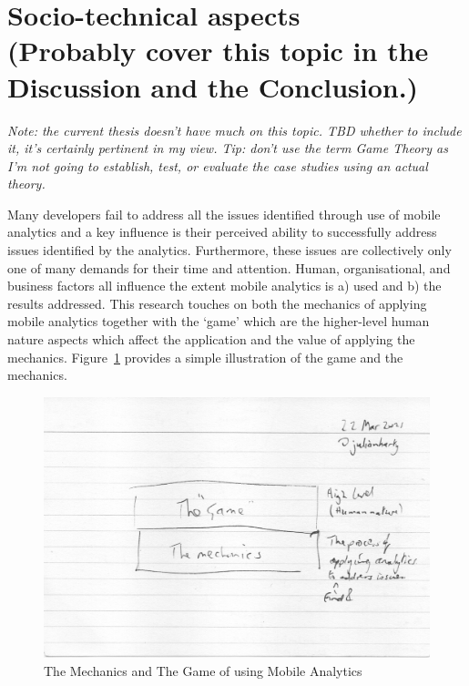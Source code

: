 \section[Socio-technical aspects]{Socio-technical aspects\\ \small{(Probably cover this topic in the Discussion and the Conclusion.)}}

\emph{Note: the current thesis doesn't have much on this topic. TBD whether to include it, it's certainly pertinent in my view. Tip: don't use the term Game Theory as I'm not going to establish, test, or evaluate the case studies using an actual theory.}

Many developers fail to address all the issues identified through use of mobile analytics and a key influence is their perceived ability to successfully address issues identified by the analytics. Furthermore, these issues are collectively only one of many demands for their time and attention. Human, organisational, and business factors all influence the extent mobile analytics is a) used and b) the results addressed. This research touches on both the mechanics of applying mobile analytics together with the `game' which are the higher-level human nature aspects which affect the application and the value of applying the mechanics. Figure~\ref{fig:the-mechanics-the-game} provides a simple illustration of the game and the mechanics.

\begin{figure}
    \centering
    \includegraphics[width=15cm]{images/rough-sketches/The-Mechanics-The-Game.jpeg}
    \caption{The Mechanics and The Game of using Mobile Analytics}
    \label{fig:the-mechanics-the-game}
\end{figure}


